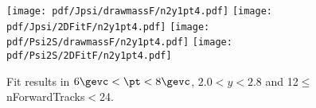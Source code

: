 \begin{figure}[H]
\begin{center}
\texttt{[image: pdf/Jpsi/drawmassF/n2y1pt4.pdf]}
\texttt{[image: pdf/Jpsi/2DFitF/n2y1pt4.pdf]}
\vspace*{-0.5cm}
\texttt{[image: pdf/Psi2S/drawmassF/n2y1pt4.pdf]}
\texttt{[image: pdf/Psi2S/2DFitF/n2y1pt4.pdf]}
\vspace*{-0.5cm}
\end{center}
\caption{Fit results in $6\gevc<\pt<8\gevc$, $2.0<y<2.8$ and 12$\leq$nForwardTracks$<$24.}
\label{Fitn2y1pt4}
\end{figure}
